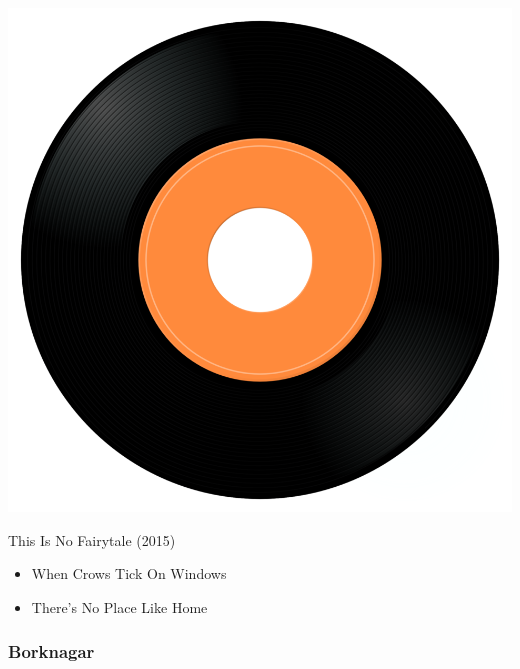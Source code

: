 \begin{minipage}[t]{0.25\textwidth}
\captionsetup{type=figure}
\includegraphics[width=\textwidth]{Images/cover.png}
\caption*{This Is No Fairytale (2015)}
\end{minipage}
\begin{minipage}[t]{0.25\textwidth}\vspace{0pt}
\begin{itemize}[nosep,leftmargin=1em,labelwidth=*,align=left]
	\setlength{\itemsep}{0pt}
	\item When Crows Tick On Windows
	\item There's No Place Like Home
\end{itemize}
\end{minipage}

\subsubsection{Borknagar}

